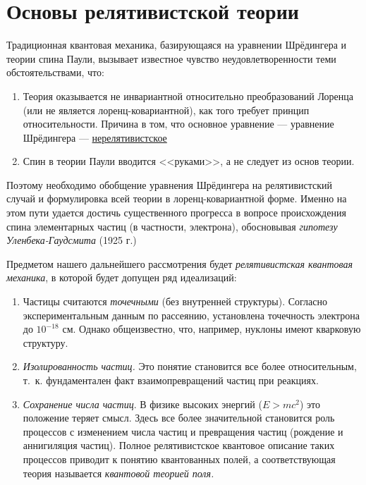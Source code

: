 \chapter{Основы релятивистской теории}

Традиционная квантовая механика, базирующаяся на уравнении Шрёдингера и теории спина Паули, вызывает известное чувство неудовлетворенности теми обстоятельствами, что:

\begin{sloppypar}
\begin{enumerate}
\item{Теория оказывается не инвариантной относительно преобразований Лоренца\footnotemark{} (или не является лоренц-ковариантной), как того требует принцип относительности. Причина в том, что основное уравнение --- уравнение Шрёдингера --- \underline{нерелятивистское}}
\item{Спин в теории Паули вводится <<руками>>, а не следует из основ теории.}
\end{enumerate}
\end{sloppypar}

Поэтому необходимо обобщение уравнения Шрёдингера на релятивистский случай и формулировка всей теории в лоренц-ковариантной форме. Именно на этом пути удается достичь существенного прогресса в вопросе происхождения спина элементарных частиц (в частности, электрона), обосновывая {\em гипотезу Уленбека-Гаудсмита}\footnotemark{} (1925 г.)

Предметом нашего дальнейшего рассмотрения будет {\em релятивистская квантовая механика}, в которой будет допущен ряд идеализаций:
\begin{enumerate}
\item{Частицы считаются {\em точечными} (без внутренней структуры). Согласно экспериментальным данным по рассеянию, установлена точечность электрона до $10^{-18}$ см. Однако общеизвестно, что, например, нуклоны имеют кварковую структуру.}

\item{{\em Изолированность частиц.} Это понятие становится все более относительным, т.~к. фундаментален факт взаимопревращений частиц при реакциях.}
\item{{\em Сохранение числа частиц}. В физике высоких энергий (${E > mc^2}$) это положение теряет смысл. Здесь все более значительной становится роль процессов с изменением числа частиц и превращения частиц (рождение и аннигиляция частиц). Полное релятивистское квантовое описание таких процессов приводит к понятию квантованных полей, а соответствующая теория называется {\em квантовой теорией поля.}}
\end{enumerate}

